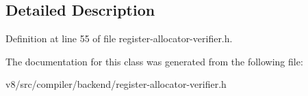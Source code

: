 \subsection{Detailed Description}


Definition at line 55 of file register-\/allocator-\/verifier.\+h.



The documentation for this class was generated from the following file\+:\begin{DoxyCompactItemize}
\item 
v8/src/compiler/backend/register-\/allocator-\/verifier.\+h\end{DoxyCompactItemize}
